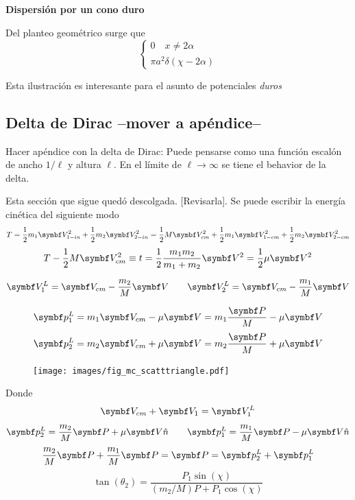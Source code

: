 \documentclass[10pt,oneside]{CBFT_book}
\begin{document}
\begin{ejemplo}{\bf Dispersión por un cono duro}

Del planteo geométrico surge que 
\[
	\begin{cases}
	0 \quad x \neq 2\alpha \\
	\pi a^2 \delta (\chi - 2\alpha)
	\end{cases}
\]

Esta ilustración es interesante para el asunto de potenciales {\it duros}

\end{ejemplo}

\subsection{Delta de Dirac --mover a apéndice--}
Hacer apéndice con la delta de Dirac:
Puede pensarse como una función escalón de ancho $1/\ell$ y altura $\ell$.
En el límite de $\ell \to \infty$ se tiene el behavior de la delta.


Esta sección que sigue quedó descolgada. [Revisarla].
Se puede escribir la energía cinética del siguiente modo
\[
	T = \frac{1}{2} m_1 \vb{V}_{1-in}^2 + \frac{1}{2} m_2 \vb{V}_{2-in}^2 =
	\frac{1}{2} M \vb{V}_{cm}^2 + \frac{1}{2} m_1 \vb{V}_{1-cm}^2 + \frac{1}{2} m_2 \vb{V}_{2-cm}^2 
\]
\[
	T - \frac{1}{2} M \vb{V}_{cm}^2 \equiv t = \frac{1}{2} \frac{m_1 m_2}{m_1 + m_2} \vb{V}^2 =
							\frac{1}{2} \mu \vb{V}^2
\]

\[
	\vb{V}_1^L = \vb{V}_{cm} - \frac{m_2}{M} \vb{V}	\qquad \vb{V}_2^L = \vb{V}_{cm} - \frac{m_1}{M} \vb{V}
\]

\[
	\vb{p}_1^L = m_1 \vb{V}_{cm} - \mu \vb{V} = m_1 \frac{\vb{P}}{M} - \mu \vb{V}
\]
\[
	\vb{p}_2^L = m_2 \vb{V}_{cm} + \mu \vb{V} = m_2 \frac{\vb{P}}{M} + \mu \vb{V}
\]
\begin{figure}[htb]
	\begin{center}
	\texttt{[image: images/fig\_mc\_scatttriangle.pdf]}	 
	\end{center}
	\caption{}
\end{figure} 
Donde 
\[
	\vb{V}_{cm} + \vb{V}_1 = \vb{V}_1^L
\]
\[
	\vb{p}_2^L = \frac{m_2}{M} \vb{P} + \mu \vb{V}\hat{n}		\qquad	 \vb{p}_1^L = \frac{m_1}{M} \vb{P} - \mu \vb{V}\hat{n}
\]
\[
	\frac{m_2}{M} \vb{P} + \frac{m_1}{M} \vb{P} = \vb{P} = \vb{p}_2^L + \vb{p}_1^L
\]
\[
	\tan(\theta_2) = \frac{P_1 \sin(\chi)}{ (m_2/M) P + P_1\cos(\chi)}
\]

\end{document}
